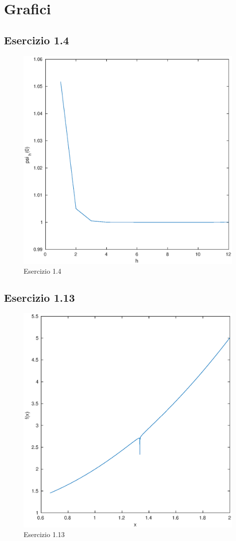 \section{\textbf{Grafici}}
\subsection{Esercizio 1.4}
\begin{figure}[h]
\caption{Esercizio 1.4}
\label{fes14}
\includegraphics[width=\textwidth]{plot/fes14}
\end{figure}
\subsection{Esercizio 1.13}
\begin{figure}[h]
\caption{Esercizio 1.13}
\label{fes113}
\includegraphics[width=\textwidth]{plot/fes113}
\end{figure}